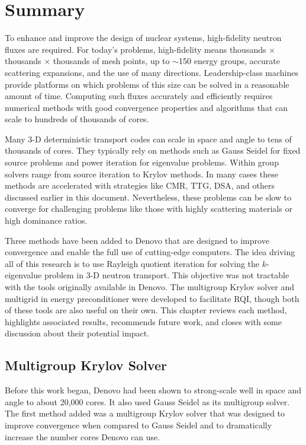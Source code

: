 
\chapter{Summary}
\label{sec:Chp5}
To enhance and improve the design of nuclear systems, high-fidelity neutron fluxes are required. For today's problems, high-fidelity means thousands $\times$ thousands $\times$ thousands of mesh points, up to $\sim$150 energy groups, accurate scattering expansions, and the use of many directions. Leadership-class machines provide platforms on which problems of this size can be solved in a reasonable amount of time. Computing such fluxes accurately and efficiently requires numerical methods with good convergence properties and algorithms that can scale to hundreds of thousands of cores. 

Many 3-D deterministic transport codes can scale in space and angle to tens of thousands of cores. They typically rely on methods such as Gauss Seidel for fixed source problems and power iteration for eigenvalue problems. Within group solvers range from source iteration to Krylov methods. In many cases these methods are accelerated with strategies like CMR, TTG, DSA, and others discussed earlier in this document. Nevertheless, these problems can be slow to converge for challenging problems like those with highly scattering materials or high dominance ratios. 

Three methods have been added to Denovo that are designed to improve convergence and enable the full use of cutting-edge computers. The idea driving all of this research is to use Rayleigh quotient iteration for solving the $k$-eigenvalue problem in 3-D neutron transport. This objective was not tractable with the tools originally available in Denovo. The multigroup Krylov solver and multigrid in energy preconditioner were developed to facilitate RQI, though both of these tools are also useful on their own. This chapter reviews each method, highlights associated results, recommends future work, and closes with some discussion about their potential impact. 

\section{Multigroup Krylov Solver}
Before this work began, Denovo had been shown to strong-scale well in space and angle to about 20,000 cores. It also used Gauss Seidel as its multigroup solver. The first method added was a multigroup Krylov solver that was designed to improve convergence when compared to Gauss Seidel and to dramatically increase the number cores Denovo can use. 

